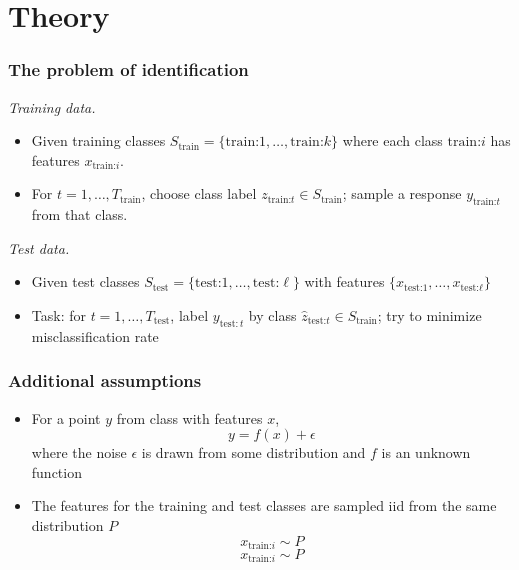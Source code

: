 \documentclass{beamer}
\begin{document}
\section{Theory}

\frame{\sectionpage}

\begin{frame}
\frametitle{The problem of identification}
\emph{Training data.}
\begin{itemize}
\item
Given training classes $S_{\text{train}} = \{\text{train:}1,\hdots,
\text{train:}k\}$ where each class $\text{train:}i$ has features
$x_{\text{train:}i}$.
\item
For $t = 1,\hdots, T_{\text{train}}$, choose class label
$z_{\text{train:} t} \in S_{\text{train}}$; sample a response
$y_{\text{train:} t}$ from that class.
\end{itemize}
\emph{Test data.}
\begin{itemize}
\item
Given test classes $S_{\text{test}} = \{\text{test:}1,\hdots,
\text{test:}\ell\}$ with features $\{x_{\text{test:} 1}, \hdots,
x_{\text{test:} \ell}\}$
\item
Task: for $t = 1,\hdots, T_{\text{test}}$, label $y_{\text{test}: t}$
by class $\hat{z}_{\text{test:} t} \in S_{\text{train}}$; try to
minimize misclassification rate
\end{itemize}
\end{frame}

\begin{frame}
\frametitle{Additional assumptions}
\begin{itemize}
\item For a point $y$ from class with features $x$,
\[
y = f(x) + \epsilon
\]
where the noise $\epsilon$ is drawn from some distribution and $f$ is an unknown function
\item The features for the training and test classes are sampled iid from the same distribution $P$
\[x_{\text{train:} i} \sim P\]
\[x_{\text{train:} i} \sim P\]
\end{itemize}
\end{frame}
\end{document}

